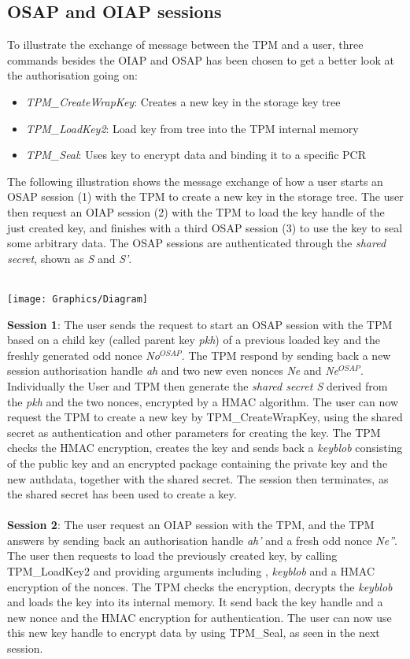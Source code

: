 \subsection{OSAP and OIAP sessions}
To illustrate the exchange of message between the TPM and a user, three commands besides the OIAP and OSAP has been chosen to get a better look at the authorisation going on:
\begin{itemize}
	\item \textit{TPM\_CreateWrapKey}: Creates a new key in the storage key tree
	\item \textit{TPM\_LoadKey2}: Load key from tree into the TPM internal memory
	\item \textit{TPM\_Seal}: Uses key to encrypt data and binding it to a specific PCR
\end{itemize}
The following illustration shows the message exchange of how a user starts an OSAP session (1) with the TPM to create a new key in the storage tree. The user then request an OIAP session (2) with the TPM to load the key handle of the just created key, and finishes with a third OSAP session (3) to use the key to seal some arbitrary data. The OSAP sessions are authenticated through the \textit{shared secret}, shown as \textit{S} and \textit{S'}. \\ \\
\begin{center}
\texttt{[image: Graphics/Diagram]}
\end{center}
\textbf{Session 1}: The user sends the request to start an OSAP session with the TPM based on a child key (called parent key \textit{pkh}) of a previous loaded key and the freshly generated odd nonce \textit{No$^{OSAP}$}. The TPM respond by sending back a new session authorisation handle \textit{ah} and two new even nonces \textit{Ne} and \textit{Ne$^{OSAP}$}. Individually the User and TPM then generate the \textit{shared secret S} derived from the \textit{pkh} and the two nonces, encrypted by a HMAC algorithm. The user can now request the TPM to create a new key by TPM\_CreateWrapKey, using the shared secret as authentication and other parameters for creating the key. The TPM checks the HMAC encryption, creates the key and sends back a \textit{keyblob} consisting of the public key and an encrypted package containing the private key and the new authdata, together with the shared secret. The session then terminates, as the shared secret has been used to create a key. \\ \\
\textbf{Session 2}: The user request an OIAP session with the TPM, and the TPM answers by sending back an authorisation handle \textit{ah'} and a fresh odd nonce \textit{Ne''}. The user then requests to load the previously created key, by calling TPM\_LoadKey2 and providing arguments including , \textit{keyblob} and a HMAC encryption of the nonces. The TPM checks the encryption, decrypts the \textit{keyblob} and loads the key into its internal memory. It send back the key handle  and a new nonce and the HMAC encryption for authentication. The user can now use this new key handle to encrypt data by using TPM\_Seal, as seen in the next session. \\ \\
